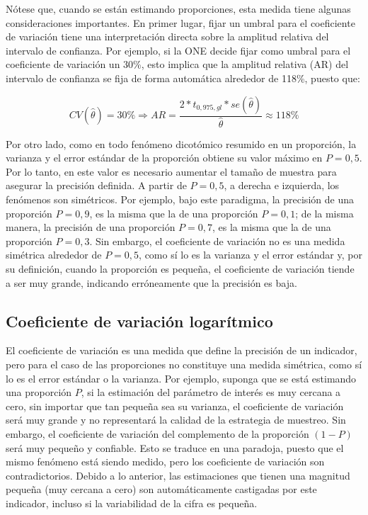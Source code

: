 \documentclass[
  12pt,
]{book}
\begin{document}
Nótese que, cuando se están estimando proporciones, esta medida tiene algunas consideraciones importantes. En primer lugar, fijar un umbral para el coeficiente de variación tiene una interpretación directa sobre la amplitud relativa del intervalo de confianza. Por ejemplo, si la ONE decide fijar como umbral para el coeficiente de variación un 30\%, esto implica que la amplitud relativa (AR) del intervalo de confianza se fija de forma automática alrededor de 118\%, puesto que:

\[
CV(\hat\theta) = 30\% 
\Rightarrow 
AR = \frac{2*t_{0,975, gl} * se(\hat\theta)}{\hat\theta} \approx 118\%
\]

Por otro lado, como en todo fenómeno dicotómico resumido en un proporción, la varianza y el error estándar de la proporción obtiene su valor máximo en \(P=0,5\). Por lo tanto, en este valor es necesario aumentar el tamaño de muestra para asegurar la precisión definida. A partir de \(P=0,5\), a derecha e izquierda, los fenómenos son simétricos. Por ejemplo, bajo este paradigma, la precisión de una proporción \(P=0,9\), es la misma que la de una proporción \(P=0,1\); de la misma manera, la precisión de una proporción \(P=0,7\), es la misma que la de una proporción \(P=0,3\). Sin embargo, el coeficiente de variación no es una medida simétrica alrededor de \(P=0,5\), como sí lo es la varianza y el error estándar y, por su definición, cuando la proporción es pequeña, el coeficiente de variación tiende a ser muy grande, indicando erróneamente que la precisión es baja.

\hypertarget{coeficiente-de-variaciuxf3n-logaruxedtmico}{%
\subsection{Coeficiente de variación logarítmico}\label{coeficiente-de-variaciuxf3n-logaruxedtmico}}

El coeficiente de variación es una medida que define la precisión de un indicador, pero para el caso de las proporciones no constituye una medida simétrica, como sí lo es el error estándar o la varianza. Por ejemplo, suponga que se está estimando una proporción \(P\), si la estimación del parámetro de interés es muy cercana a cero, sin importar que tan pequeña sea su varianza, el coeficiente de variación será muy grande y no representará la calidad de la estrategia de muestreo. Sin embargo, el coeficiente de variación del complemento de la proporción \((1-P)\) será muy pequeño y confiable. Esto se traduce en una paradoja, puesto que el mismo fenómeno está siendo medido, pero los coeficiente de variación son contradictorios. Debido a lo anterior, las estimaciones que tienen una magnitud pequeña (muy cercana a cero) son automáticamente castigadas por este indicador, incluso si la variabilidad de la cifra es pequeña.
\end{document}
